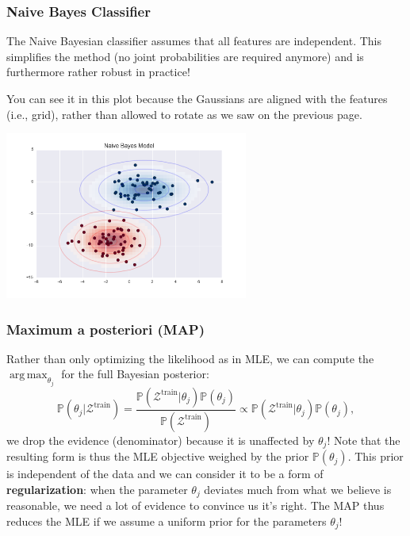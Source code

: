 \documentclass{article}
\DeclareMathOperator*{\argmax}{arg\,max}
\begin{document}
\subsubsection{Naive Bayes Classifier}
The Naive Bayesian classifier assumes that all features are independent. This simplifies the method (no joint probabilities are required anymore) and is furthermore rather robust in practice!
\begin{testexample}
    You can see it in this plot because the Gaussians are aligned with the features (i.e., grid), rather than allowed to rotate as we saw on the previous page.
    \begin{center}\includegraphics[width=0.6\textwidth]{naivegaussian.png}\end{center}
\end{testexample}
\vspace{-0.5cm}

\subsubsection{Maximum a posteriori (MAP)}
Rather than only optimizing the likelihood as in MLE, we can compute the $\argmax_{\theta_j}$ for the full Bayesian posterior:
\begin{equation}
    \mathbb{P}(\theta_j|\mathcal{Z}^\text{train}) = \frac{\mathbb{P}(\mathcal{Z}^\text{train}|\theta_j)\mathbb{P}(\theta_j)}{\mathbb{P}(\mathcal{Z}^\text{train})} \propto \mathbb{P}(\mathcal{Z}^\text{train}|\theta_j)\mathbb{P}(\theta_j),
\end{equation}
we drop the evidence (denominator) because it is unaffected by $\theta_j$! Note that the resulting form is thus the MLE objective weighed by the prior $\mathbb{P}(\theta_j)$. This prior is independent of the data and we can consider it to be a form of \textbf{regularization}: when the parameter $\theta_j$ deviates much from what we believe is reasonable, we need a lot of evidence to convince us it's right. The MAP thus reduces the MLE if we assume a uniform prior for the parameters $\theta_j$!
\end{document}
